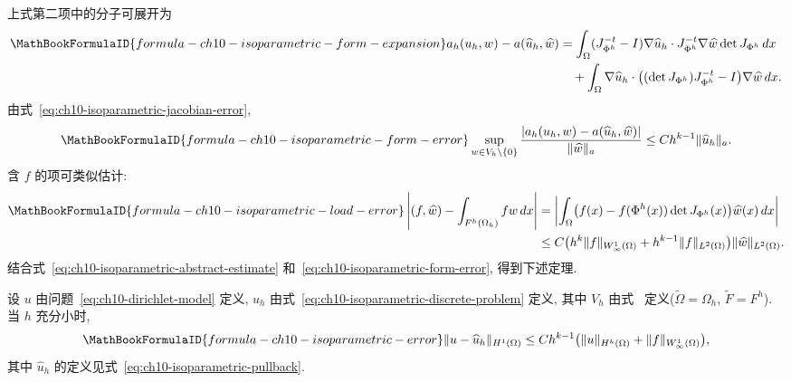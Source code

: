 上式第二项中的分子可展开为
\begin{align*}
\MathBookFormulaID{formula-ch10-isoparametric-form-expansion}
a_h(u_h,w)-a(\widehat u_h,\widehat w)
&=\int_\Omega(J_{\Phi^h}^{-t}-I)\nabla\widehat u_h\cdot
J_{\Phi^h}^{-t}\nabla\widehat w\det J_{\Phi^h}\,dx\\
&\quad+\int_\Omega\nabla\widehat u_h\cdot
\bigl((\det J_{\Phi^h})J_{\Phi^h}^{-t}-I\bigr)\nabla\widehat w\,dx.
\end{align*}
由式~\eqref{eq:ch10-isoparametric-jacobian-error},
\begin{equation}
\MathBookFormulaID{formula-ch10-isoparametric-form-error}
\label{eq:ch10-isoparametric-form-error}
\sup_{w\in V_h\setminus\{0\}}
\frac{|a_h(u_h,w)-a(\widehat u_h,\widehat w)|}{\|\widehat w\|_a}
\leq Ch^{k-1}\|\widehat u_h\|_a.
\end{equation}
含 $f$ 的项可类似估计:
\begin{align*}
\MathBookFormulaID{formula-ch10-isoparametric-load-error}
\left|(f,\widehat w)-\int_{F^h(\Omega_h)}fw\,dx\right|
&=\left|\int_\Omega\bigl(f(x)-f(\Phi^h(x))\det J_{\Phi^h}(x)\bigr)\widehat w(x)\,dx\right|\\
&\leq C\bigl(h^k\|f\|_{W_\infty^1(\Omega)}+h^{k-1}\|f\|_{L^2(\Omega)}\bigr)
\|\widehat w\|_{L^2(\Omega)}.
\end{align*}
结合式~\eqref{eq:ch10-isoparametric-abstract-estimate} 和~\eqref{eq:ch10-isoparametric-form-error}, 得到下述定理.

\begin{Theorem}
\label{thm:ch10-isoparametric-error}
设 $u$ 由问题~\eqref{eq:ch10-dirichlet-model} 定义, $u_h$ 由式~\eqref{eq:ch10-isoparametric-discrete-problem} 定义, 其中 $V_h$ 由式~ 定义($\widetilde\Omega=\Omega_h$, $\widetilde F=F^h$). 当 $h$ 充分小时,
\[
\MathBookFormulaID{formula-ch10-isoparametric-error}
\|u-\widehat u_h\|_{H^1(\Omega)}
\leq Ch^{k-1}\bigl(\|u\|_{H^k(\Omega)}+\|f\|_{W_\infty^1(\Omega)}\bigr),
\]
其中 $\widehat u_h$ 的定义见式~\eqref{eq:ch10-isoparametric-pullback}.
\end{Theorem}
